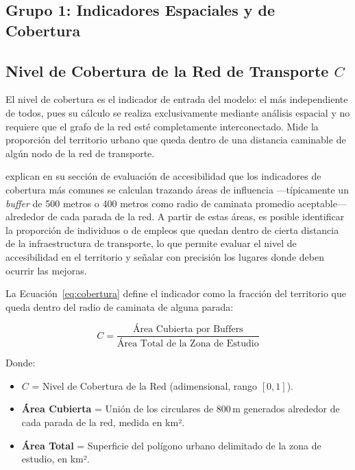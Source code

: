 
\subsection*{Grupo 1: Indicadores Espaciales y de Cobertura}

\subsection{Nivel de Cobertura de la Red de Transporte \texorpdfstring{$C$}{C}}
\label{subsec:indicador-cobertura}

El nivel de cobertura es el indicador de entrada del modelo: el más
independiente de todos, pues su cálculo se realiza exclusivamente mediante
análisis espacial y no requiere que el grafo de la red esté completamente
interconectado. Mide la proporción del territorio urbano que queda dentro de una
distancia caminable de algún nodo de la red de transporte.

\citet{fortin2016innovative} explican en su sección de evaluación de
accesibilidad que los indicadores de cobertura más comunes se calculan trazando
áreas de influencia ---típicamente un \textit{buffer} de 500 metros o 400 metros
como radio de caminata promedio aceptable--- alrededor de cada parada de la red.
A partir de estas áreas, es posible identificar la proporción de individuos o de
empleos que quedan dentro de cierta distancia de la infraestructura de
transporte, lo que permite evaluar el nivel de accesibilidad en el territorio y
señalar con precisión los lugares donde deben ocurrir las mejoras.

La Ecuación~\eqref{eq:cobertura} define el indicador como la fracción del
territorio que queda dentro del radio de caminata de alguna parada:

\begin{equation}
    C = \frac{\text{Área Cubierta por Buffers}}{\text{Área Total de la Zona de Estudio}}
    \label{eq:cobertura}
\end{equation}

Donde:
\begin{itemize}
    \item $C$ = Nivel de Cobertura de la Red (adimensional, rango $[0, 1]$).
\item \textbf{Área Cubierta} = Unión de los  circulares de 800\,m
    generados alrededor de cada parada de la red, medida en km².
\item \textbf{Área Total} = Superficie del polígono urbano delimitado de la zona
    de estudio, en km².
\end{itemize}

